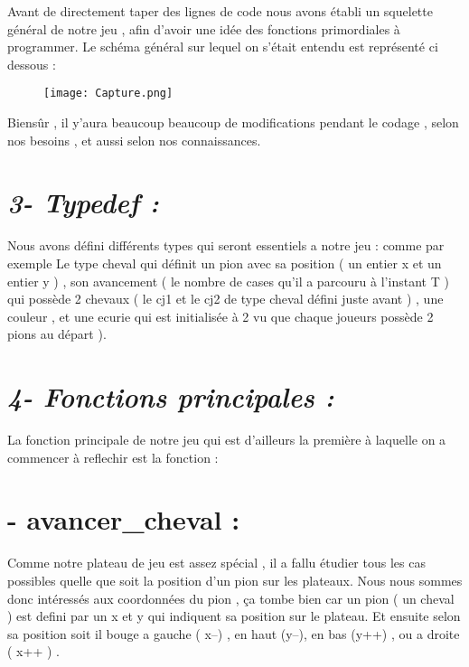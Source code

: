 \documentclass[12pt, openany]{report}
\begin{document}
\large{Avant de directement taper des lignes de code nous avons établi un squelette général de notre jeu , afin d'avoir une idée des fonctions primordiales à programmer. 
Le schéma général sur lequel on s'était entendu est représenté ci dessous : 
       \begin{figure}[h]
    \begin{minipage}[c]{.46\linewidth}
        \centering
        \texttt{[image: Capture.png]} 
       
    \end{minipage}
    \end{figure}
Biensûr , il y'aura beaucoup beaucoup de modifications pendant le codage , selon nos besoins , et aussi selon nos connaissances.}


\newpage
\section*{ \Large\it{3- Typedef :}} 

\large {Nous avons défini différents types qui seront essentiels a notre jeu : 
comme par exemple \newline
\color{red}Le type cheval}\color{black}  qui définit un pion avec sa position ( un entier x et un entier y ) , son avancement ( le nombre de cases qu'il a parcouru à l'instant T ) \newline
\color{red}{Le type joueur}\color{black}   qui possède 2 chevaux ( le cj1 et le cj2 de type cheval défini juste avant )  , une couleur , et une ecurie qui est initialisée à 2 vu que chaque joueurs possède 2 pions au départ ). 

\section*{ \Large\it{4- Fonctions principales :}}
\large{La fonction principale de notre jeu qui est d'ailleurs la première à laquelle on a commencer à reflechir est la fonction : 
\section*{ - avancer\_cheval :} 
Comme notre plateau de jeu est assez spécial , il a fallu étudier tous les cas possibles quelle que soit la position d'un pion sur les plateaux. 
Nous nous sommes donc intéressés aux coordonnées du pion , ça tombe bien car un pion ( un cheval ) est defini par un x et y qui indiquent sa position sur le plateau. 
Et ensuite selon sa position soit il bouge a gauche ( x--) , en haut (y--), en bas (y++) , ou a droite ( x++ ) .} 
\end{document}

